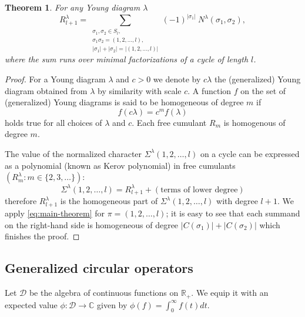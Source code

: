 \documentclass[12pt]{amsart}
\theoremstyle{plain}
\newtheorem{theorem}[lemma]{Theorem}
\theoremstyle{remark}
\newcommand{\R}{\mathbb{R}}
\newcommand{\C}{\mathbb{C}}
\newcommand{\D}{\mathcal{D}}
\begin{document}
\begin{theorem}\label{theo:cumulants}
For any Young diagram $\lambda$
\begin{equation} 
\label{eq:freecumulants-come}
R_{l+1}^{\lambda}= \sum_{\substack{\sigma_1,\sigma_2\in S_l,\\
\sigma_1 \sigma_2=(1,2,\dots,l), \\
|\sigma_1|+|\sigma_2|=|(1,2,\dots,l)|}} (-1)^{|\sigma_1|}\
N^{\lambda}(\sigma_1,\sigma_2),
\end{equation}
where the sum runs over minimal factorizations of a cycle of length $l$.
\end{theorem}
\begin{proof}
For a Young diagram $\lambda$ and $c>0$ we denote by $c\lambda$ the
(generalized) Young diagram obtained from $\lambda$ by similarity with scale
$c$. A function $f$ on the set of (generalized) Young diagrams
is said to be homogeneous of degree $m$ if
$$f(c \lambda)= c^m f(\lambda)$$
holds true for all choices of $\lambda$ and $c$. Each free cumulant $R_m$ is homogenous of degree $m$.




The value of the normalized character $\Sigma^{\lambda}(1,2,\dots,l)$ on a cycle
can be expressed as a polynomial (known as Kerov polynomial) in free cumulants
$(R^{\lambda}_{m}: m\in\{2,3,\dots\} )$:
$$ \Sigma^{\lambda}(1,2,\dots,l)= R_{l+1}^{\lambda} + (\text{terms of lower
degree}) $$
therefore $R^\lambda_{l+1}$ is the homogeneous part of
$\Sigma^{\lambda}(1,2,\dots,l)$ with degree $l+1$.
We apply \eqref{eq:main-theorem} for $\pi=(1,2,\dots,l)$;
it is easy to see that each summand on the right-hand side is homogeneous of degree
$|C(\sigma_1)|+|C(\sigma_2)|$ which finishes the proof.
\end{proof}


\subsection{Generalized circular operators}
Let $\D$ be the algebra of continuous  functions on $\R_+$. We equip it with an
expected value
$\phi:\D\rightarrow \C$ given by $\phi(f)=\int_0^{\infty} f(t) dt$.
\end{document}
